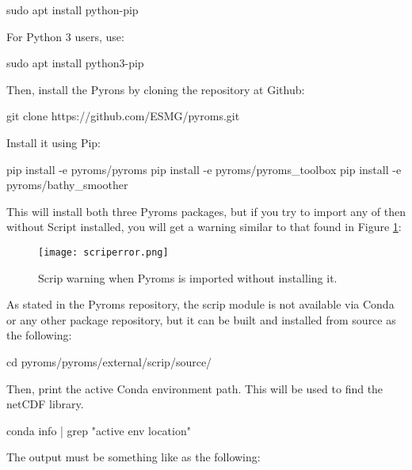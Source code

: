 \begin{bashcode}
  sudo apt install python-pip
\end{bashcode}
\bigskip

\noindent For Python 3 users, use:
\bigskip
\begin{bashcode}
sudo apt install python3-pip
\end{bashcode}
\bigskip

\noindent Then, install the Pyrons by cloning the repository at Github:
\bigskip

\begin{bashcode}
git clone https://github.com/ESMG/pyroms.git
\end{bashcode}
\bigskip

\noindent Install it using Pip:
\bigskip

\begin{bashcode}
pip install -e pyroms/pyroms
pip install -e pyroms/pyroms_toolbox
pip install -e pyroms/bathy_smoother
\end{bashcode}
\bigskip

\noindent This will install both three Pyroms packages, but if you try to import any of then without Script installed, you will get a warning 
similar to that found in \textcolor{bleu_cite}{Figure \ref{scriperror}}:
\bigskip

\begin{figure}[H]
  \centering
  \texttt{[image: scriperror.png]}
  \caption{Scrip warning when Pyroms is imported without installing it.}
  \label{scriperror}
\end{figure}
\bigskip

\noindent As stated in the Pyroms repository, the scrip module is not available via Conda or any other package repository, but it can be built 
and installed from source as the following:
\bigskip

\begin{bashcode}
cd pyroms/pyroms/external/scrip/source/
\end{bashcode}
\bigskip

\noindent Then, print the active Conda environment path. This will be used to find the netCDF library.
\bigskip

\begin{bashcode}
conda info | grep "active env location"
\end{bashcode}
\bigskip

\noindent The output must be something like as the following:
\bigskip

